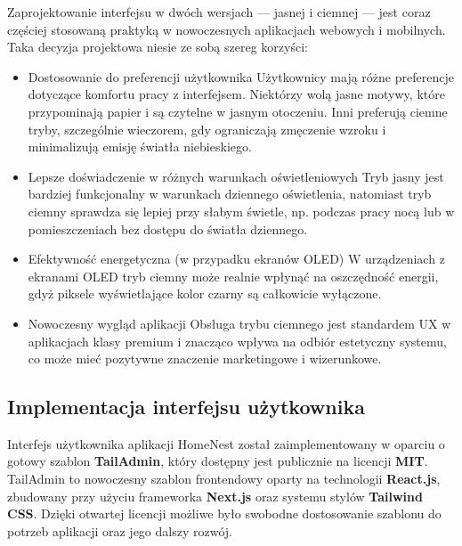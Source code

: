 Zaprojektowanie interfejsu w dwóch wersjach — jasnej i ciemnej — jest coraz częściej stosowaną praktyką w nowoczesnych aplikacjach webowych i mobilnych. Taka decyzja projektowa niesie ze sobą szereg korzyści:
\begin{itemize}
  \item Dostosowanie do preferencji użytkownika
  Użytkownicy mają różne preferencje dotyczące komfortu pracy z interfejsem. Niektórzy wolą jasne motywy, które przypominają papier i są czytelne w jasnym otoczeniu. Inni preferują ciemne tryby, szczególnie wieczorem, gdy ograniczają zmęczenie wzroku i minimalizują emisję światła niebieskiego.
  \item Lepsze doświadczenie w różnych warunkach oświetleniowych
  Tryb jasny jest bardziej funkcjonalny w warunkach dziennego oświetlenia, natomiast tryb ciemny sprawdza się lepiej przy słabym świetle, np. podczas pracy nocą lub w pomieszczeniach bez dostępu do światła dziennego.
  \item Efektywność energetyczna (w przypadku ekranów OLED)
  W urządzeniach z ekranami OLED tryb ciemny może realnie wpłynąć na oszczędność energii, gdyż piksele wyświetlające kolor czarny są całkowicie wyłączone.
  \item Nowoczesny wygląd aplikacji
  Obsługa trybu ciemnego jest standardem UX w aplikacjach klasy premium i znacząco wpływa na odbiór estetyczny systemu, co może mieć pozytywne znaczenie marketingowe i wizerunkowe.
\end{itemize}


\subsection{Implementacja interfejsu użytkownika}

Interfejs użytkownika aplikacji HomeNest został zaimplementowany w oparciu o gotowy szablon \textbf{TailAdmin}\cite{TailAdmin}, który dostępny jest publicznie na licencji \textbf{MIT}. TailAdmin to nowoczesny szablon frontendowy oparty na technologii \textbf{React.js}, zbudowany przy użyciu frameworka \textbf{Next.js} oraz systemu stylów \textbf{Tailwind CSS}. Dzięki otwartej licencji możliwe było swobodne dostosowanie szablonu do potrzeb aplikacji oraz jego dalszy rozwój.

